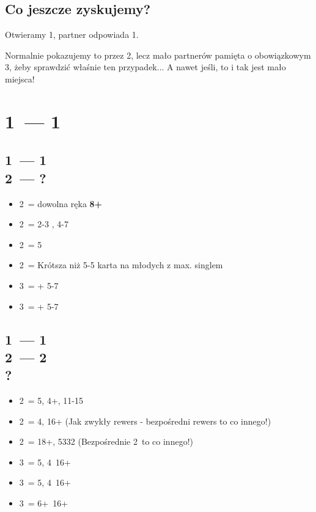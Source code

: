 \documentclass[12pt, a4paper]{article}
\begin{document}
\subsection*{Co jeszcze zyskujemy?}
Otwieramy 1\hearts, partner odpowiada 1\nt.
\begin{center}
\end{center}
Normalnie pokazujemy to przez 2\nt, lecz mało partnerów pamięta o obowiązkowym 3\clubs, żeby sprawdzić 
właśnie ten przypadek... A nawet jeśli, to i tak jest mało miejsca!




\pagebreak
\section*{1\hearts\ --- 1\ntx}

\subsection*{1\hearts\ --- 1\ntx \\ 2\clubs\ --- ?}
\begin{itemize}
    \item 2\diams\ = dowolna ręka \textbf{8+}
    \item 2\hearts\ = 2-3 \hearts, 4-7
    \item 2\spades\ = 5\diams \vimp
    \item 2\nt\ = Krótsza niż 5-5 karta na młodych z max. singlem \hearts \imp
    \item 3\clubs\ = + 5-7
    \item 3\diams\ = + 5-7
\end{itemize}

\subsection*{1\hearts\ --- 1\ntx \\ 2\clubs\ --- 2\diams \\ ?}
\begin{itemize}
    \item 2\hearts\ = 5\hearts, 4+\clubs, 11-15
    \item 2\spades\ = 4\spades, 16+ (Jak zwykły rewers - bezpośredni rewers to co innego!)
    \item 2\nt\ = 18+, 5332 (Bezpośrednie 2\nt\ to co innego!)
    \item 3\clubs\ = 5\hearts, 4\clubs\ 16+
    \item 3\diams\ = 5\hearts, 4\diams\ 16+
    \item 3\hearts\ = 6+\hearts\ 16+
\end{itemize}
\end{document}
